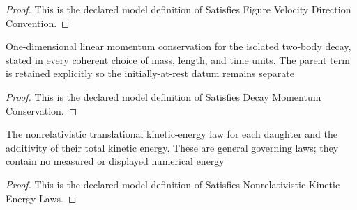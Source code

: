 \begin{proof}
  This is the declared model definition of Satisfies Figure Velocity Direction Convention.
\end{proof}
\begin{definition}
  \label{def:physics:phyx-mini-0551:phyxminiproblems-problemphyxmini0551-satisfiesdecaymomentumconservation}
  One-dimensional linear momentum conservation for the isolated two-body decay, stated in every coherent choice of mass, length, and time units. The parent term is retained explicitly so the initially-at-rest datum remains separate
\end{definition}
\begin{proof}
  This is the declared model definition of Satisfies Decay Momentum Conservation.
\end{proof}
\begin{definition}
  \label{def:physics:phyx-mini-0551:phyxminiproblems-problemphyxmini0551-satisfiesnonrelativistickineticenergylaws}
  The nonrelativistic translational kinetic-energy law for each daughter and the additivity of their total kinetic energy. These are general governing laws; they contain no measured or displayed numerical energy
\end{definition}
\begin{proof}
  This is the declared model definition of Satisfies Nonrelativistic Kinetic Energy Laws.
\end{proof}
